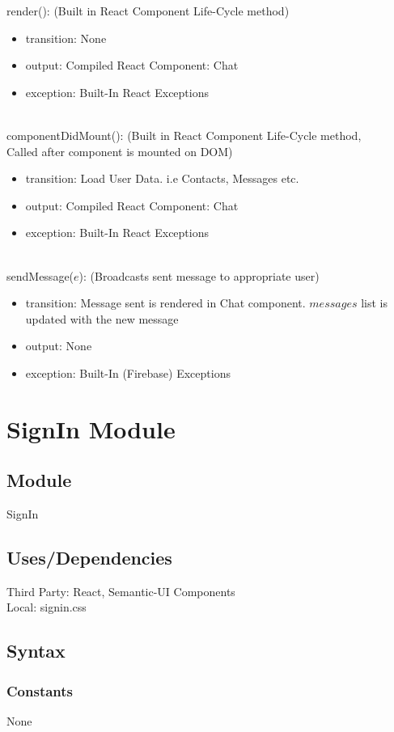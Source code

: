 \documentclass[12pt, titlepage]{article}
\begin{document}
render(): (Built in React Component Life-Cycle method)
\begin{itemize}
\item transition: None
\item output: Compiled React Component: Chat 
\item exception: Built-In React Exceptions
\end{itemize}\\
componentDidMount(): (Built in React Component Life-Cycle method, \\Called after component is mounted on DOM)
\begin{itemize}
\item transition: Load User Data. i.e Contacts, Messages etc.
\item output: Compiled React Component: Chat 
\item exception: Built-In React Exceptions
\end{itemize}\\
sendMessage($e$): (Broadcasts sent message to appropriate user)
\begin{itemize}
\item transition: Message sent is rendered in Chat component. $messages$ list is updated with the new message
\item output: None 
\item exception: Built-In (Firebase) Exceptions 
\end{itemize}

\newpage
\section* {SignIn Module}

\subsection*{Module}

SignIn

\subsection* {Uses/Dependencies}
Third Party: React, Semantic-UI Components\\
Local: signin.css

\subsection* {Syntax}

\subsubsection* {Constants} None
\end{document}
